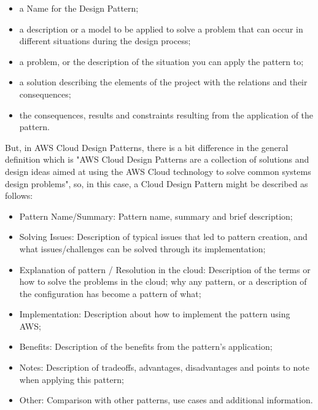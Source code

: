 \documentclass[10pt, conference]{IEEEtran}
\begin{document}
\begin{itemize}
\item a Name for the Design Pattern;
\item a description or a model to be applied to solve a problem that can occur in different situations during the design process;
\item a problem, or the description of the situation you can apply the pattern to;
\item a solution describing the elements of the project with the relations and their consequences;
\item the consequences, results and constraints resulting from the application of the pattern.
\end{itemize}

\indent But, in AWS Cloud Design Patterns, there is a bit difference in the general definition which is "AWS Cloud Design Patterns are a collection of solutions and design ideas aimed at using the AWS Cloud technology to solve common systems design problems", so, in this case, a Cloud Design Pattern might be described as follows:

\begin{itemize}
\item Pattern Name/Summary: Pattern name, summary and brief description;
\item Solving Issues: Description of typical issues that led to pattern creation, and what issues/challenges can be solved through its implementation;
\item Explanation of pattern / Resolution in the cloud: Description of the terms or how to solve the problems in the cloud; why any pattern, or a description of the configuration has become a pattern of what;
\item Implementation: Description about how to implement the pattern using AWS;
\item Benefits: Description of the benefits from the pattern’s application;
\item Notes: Description of tradeoffs, advantages, disadvantages and points to note when applying this pattern;
\item Other: Comparison with other patterns, use cases and additional information.
\end{itemize}
\end{document}
